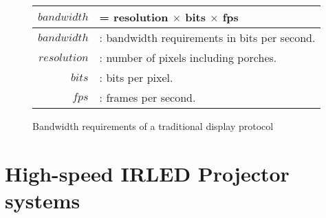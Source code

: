     \begin{figure}
        \centering
        \large
        \begin{tabular}{| r l |}
            \hline
            $$bandwidth$$ & = resolution $\times$ bits $\times$ fps \\ \hline
            $bandwidth$ & : bandwidth requirements in bits per second. \\
            $resolution$ & : number of pixels including porches. \\
            $bits$ & : bits per pixel. \\
            $fps$ & : frames per second. \\
            \hline
        \end{tabular}
        \caption{Bandwidth requirements of a traditional display protocol}
        \label{fig:bandwidth}
    \end{figure}

\section{High-speed IRLED Projector systems}
%

